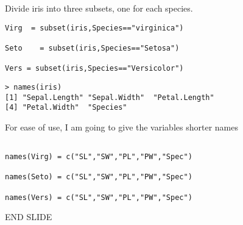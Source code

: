 \documentclass{beamer}
\begin{document}
\begin{frame}
Divide iris into three subsets, one for each species.
\begin{framed}
\begin{verbatim}
Virg  = subset(iris,Species=="virginica")

Seto    = subset(iris,Species=="Setosa")

Vers = subset(iris,Species=="Versicolor")

\end{verbatim}
\end{framed}

\end{frame}

\begin{frame}
\begin{verbatim}
> names(iris)
[1] "Sepal.Length" "Sepal.Width"  "Petal.Length"
[4] "Petal.Width"  "Species" 
\end{verbatim}

\noindent For ease of use, I am going to give the variables shorter names
\begin{framed}
\begin{verbatim}

names(Virg) = c("SL","SW","PL","PW","Spec")

names(Seto) = c("SL","SW","PL","PW","Spec")

names(Vers) = c("SL","SW","PL","PW","Spec")

\end{verbatim}
\end{framed}

\end{frame}
\begin{frame}
END SLIDE
\end{frame}
\end{document}
